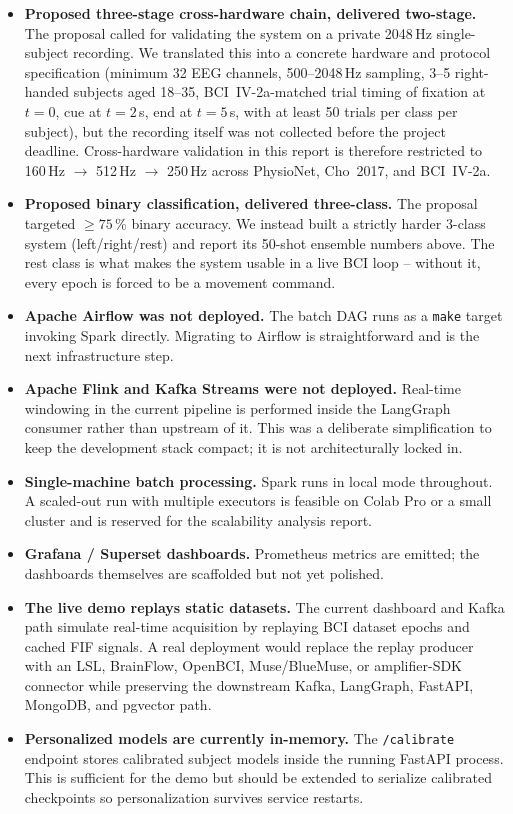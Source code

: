 \documentclass[conference]{IEEEtran}
\begin{document}
\begin{itemize}
\item \textbf{Proposed three-stage cross-hardware chain, delivered two-stage.}
      The proposal called for validating the system on a private 2048\,Hz
      single-subject recording. We translated this into a concrete hardware
      and protocol specification (minimum 32 EEG channels, 500--2048\,Hz
      sampling, 3--5 right-handed subjects aged 18--35, BCI~IV-2a-matched
      trial timing of fixation at $t=0$, cue at $t=2$\,s, end at $t=5$\,s,
      with at least 50 trials per class per subject), but the recording
      itself was not collected before the project deadline.
      Cross-hardware validation in this report is therefore restricted
      to 160\,Hz $\rightarrow$ 512\,Hz $\rightarrow$ 250\,Hz across
      PhysioNet, Cho~2017, and BCI~IV-2a.
\item \textbf{Proposed binary classification, delivered three-class.}
      The proposal targeted $\geq 75\,\%$ binary accuracy. We instead
      built a strictly harder 3-class system (left/right/rest) and report
      its 50-shot ensemble numbers above. The rest class is what makes
      the system usable in a live BCI loop -- without it, every epoch is
      forced to be a movement command.
\item \textbf{Apache Airflow was not deployed.} The batch DAG runs as a
      \texttt{make} target invoking Spark directly. Migrating to Airflow
      is straightforward and is the next infrastructure step.
\item \textbf{Apache Flink and Kafka Streams were not deployed.} Real-time
      windowing in the current pipeline is performed inside the LangGraph
      consumer rather than upstream of it. This was a deliberate
      simplification to keep the development stack compact;
      it is not architecturally locked in.
\item \textbf{Single-machine batch processing.} Spark runs in local mode
      throughout. A scaled-out run with multiple executors is feasible on
      Colab Pro or a small cluster and is reserved for the scalability
      analysis report.
\item \textbf{Grafana / Superset dashboards.} Prometheus metrics are
      emitted; the dashboards themselves are scaffolded but not yet
      polished.
\item \textbf{The live demo replays static datasets.} The current dashboard
      and Kafka path simulate real-time acquisition by replaying BCI dataset
      epochs and cached FIF signals. A real deployment would replace the replay
      producer with an LSL, BrainFlow, OpenBCI, Muse/BlueMuse, or amplifier-SDK
      connector while preserving the downstream Kafka, LangGraph, FastAPI,
      MongoDB, and pgvector path.
\item \textbf{Personalized models are currently in-memory.} The
      \texttt{/calibrate} endpoint stores calibrated subject models inside the
      running FastAPI process. This is sufficient for the demo but should be
      extended to serialize calibrated checkpoints so personalization survives
      service restarts.
\end{itemize}
\end{document}
